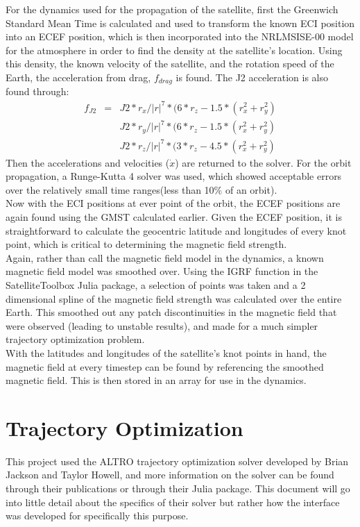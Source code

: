 \documentclass[10pt,notitlepage,twocolumn]{article}
\begin{document}
For the dynamics used for the propagation of the satellite, first the Greenwich Standard Mean Time is calculated and used to transform the known ECI position into an ECEF position, which is then incorporated into the NRLMSISE-00 model for the atmosphere in order to find the density at the satellite's location. Using this density, the known velocity of the satellite, and the rotation speed of the Earth, the acceleration from drag, $f_{drag}$ is found. The J2 acceleration is also found through:
\begin{eqnarray}
	f_{J2} & = &  J2*r_x/|r|^7*(6*r_z-1.5*(r_x^2+r_y^2)\\
	 & & J2*r_y/|r|^7*(6*r_z-1.5*(r_x^2+r_y^2)\\
	 & & J2*r_z/|r|^7*(3*r_z-4.5*(r_x^2+r_y^2)
\end{eqnarray}
Then the accelerations and velocities ($\dot x$) are returned to the solver. For the orbit propagation, a Runge-Kutta 4 solver was used, which showed acceptable errors over the relatively small time ranges(less than 10$\%$ of an orbit). \\

Now with the ECI positions at ever point of the orbit, the ECEF positions are again found using the GMST calculated earlier. Given the ECEF position, it is straightforward to calculate the geocentric latitude and longitudes of every knot point, which is critical to determining the magnetic field strength.\\

Again, rather than call the magnetic field model in the dynamics, a known magnetic field model was smoothed over. Using the IGRF function in the SatelliteToolbox Julia package, a selection of points was taken and a 2 dimensional spline of the magnetic field strength was calculated over the entire Earth. This smoothed out any patch discontinuities in the magnetic field that were observed (leading to unstable results), and made for a much simpler trajectory optimization problem.\\

With the latitudes and longitudes of the satellite's knot points in hand, the magnetic field at every timestep can be found by referencing the smoothed magnetic field. This is then stored in an array for use in the dynamics. 

\section{Trajectory Optimization}
This project used the ALTRO trajectory optimization solver developed by Brian Jackson and Taylor Howell, and more information on the solver can be found through their publications or through their Julia package. This document will go into little detail about the specifics of their solver but rather how the interface was developed for specifically this purpose.
\end{document}
